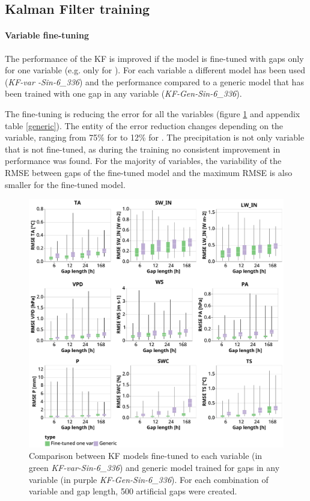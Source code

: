 \documentclass{article}
\newcommand{\imgwidth}{6in}
\let\Oldsubsection\subsection
\renewcommand{\subsection}{\FloatBarrier\Oldsubsection}
\begin{document}
\subsection{Kalman Filter training}

\paragraph{Variable fine-tuning} The performance of the KF is improved if the model is fine-tuned with gaps only for one variable (e.g. only for ). For each variable a different model has been used (\textit{KF-\textlangle var \textrangle-Sin-6\_336}) and the performance compared to a generic model that has been trained with one gap in any variable (\textit{KF-Gen-Sin-6\_336}). 

The fine-tuning is reducing the error for all the variables (figure \ref{fig:generic} and appendix table \ref{generic}). The entity of the error reduction changes depending on the variable, ranging from 75\% for  to 12\% for .
The precipitation is not only variable that is not fine-tuned, as during the training no consistent improvement in performance was found.
For the majority of variables, the variability of the RMSE between gaps of the fine-tuned model and the maximum RMSE is also smaller for the fine-tuned model.

\begin{figure}
\centerline{\includegraphics[width=\imgwidth]{generic}}
\caption{Comparison between KF models fine-tuned to each variable (in green \textit{KF-\textlangle var\textrangle-Sin-6\_336}) and generic model trained for gaps in any variable (in purple \textit{KF-Gen-Sin-6\_336}). For each combination of variable and gap length, 500 artificial gaps were created.}
\label{fig:generic}
\end{figure}
\end{document}
